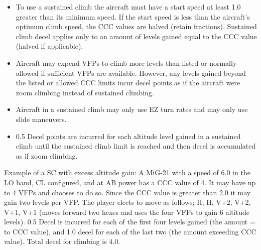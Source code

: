 \begin{itemize}
    \item{} To use a sustained climb the aircraft must have a start speed at least 1.0 greater than its minimum speed. If the start speed is less than the aircraft's optimum climb speed, the CCC values are halved (retain fractions). Sustained climb decel applies only to an amount of levels gained equal to the CCC value (halved if applicable).

    \item{} Aircraft may expend VFPs to climb more levels than listed or normally allowed if sufficient VFPs are available. However, any levels gained beyond the listed or allowed CCC limits incur decel points as if the aircraft were zoom climbing instead of sustained climbing.

    \item{} Aircraft in a sustained climb may only use EZ turn rates  and may only use slide maneuvers.

    \item{} 0.5 Decel points are incurred for each altitude level gained in a sustained climb until the sustained climb limit is reached and then decel is accumulated as if zoom climbing. 



\end{itemize}

Example of a SC with excess altitude gain: A MiG-21 with a speed of 6.0 in the LO band, CL configured, and at AB power has a CCC value of 4. It may have up to 4 VFPs and chooses to do so. Since the CCC value is greater than 2.0 it may gain two levels per VFP. The player elects to move as follows; H, H, V+2, V+2, V+1, V+1 (moves forward two hexes and uses the four VFPs to gain 6 altitude levels). 0.5 Decel is incurred for each of the first four levels gained (the amount = to CCC value), and 1.0 decel for each of the last two (the amount exceeding CCC value). Total decel for climbing is 4.0.
    
